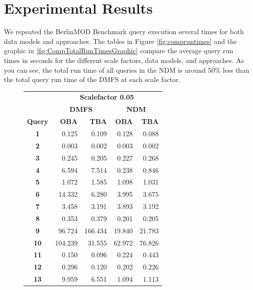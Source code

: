 \documentclass[a4paper]{article}
\newcommand{\bmodb} {BerlinMOD Benchmark}
\begin{document}
\section{Experimental Results}
\label{sec:results}
We repeated the \bmodb{} query execution several times for both data models and
approaches. The tables in Figure \ref{fig:compruntimes} and the graphic in
\ref{fig:CompTotalRunTimesGraphic} compare the average query run times in seconds
for the different scale factors, data models, and approaches.
As you can see, the total run time of all queries in the NDM is around
50\% less than the total query run time of the DMFS at each scale factor.
\begin{figure}[h]
  \begin{minipage}{0.5\linewidth}
    \begin{tiny}
      \begin{tabular}{|c|r|r|r|r|}
        \hline
        &\multicolumn{4}{c|}{\textbf{Scalefactor 0.05}}\\
        \cline{2-5}
        &\multicolumn{2}{c|}{\textbf{DMFS}}&\multicolumn{2}{c|}{\textbf{NDM}}\\
        \hline
        \textbf{Query}&\textbf{OBA}&\textbf{TBA}&\textbf{OBA}&\textbf{TBA}\\
        \hline
        \textbf{1}&0.125&0.109&0.128&0.088\\
        \hline
        \textbf{2}&0.003&0.002&0.003&0.002\\
        \hline
        \textbf{3}&0.245&0.205&0.227&0.268\\
        \hline
        \textbf{4}&6.594&7.514&0.238&0.846\\
        \hline
        \textbf{5}&1.072&1.585&1.098&1.031\\
        \hline
        \textbf{6}&14.332&6.280&3.995&3.675\\
        \hline
        \textbf{7}&3.458&3.191&3.893&3.192\\
        \hline
        \textbf{8}&0.353&0.379&0.201&0.205\\
        \hline
        \textbf{9}&96.724&166.434&19.840&21.783\\
        \hline
        \textbf{10}&104.239&31.555&62.972&76.826\\
        \hline
        \textbf{11}&0.150&0.096&0.224&0.443\\
        \hline
        \textbf{12}&0.296&0.120&0.202&0.226\\
        \hline
        \textbf{13}&9.959&6.551&1.094&1.113\\

\end{tabular}
\end{tiny}
\end{minipage}
\end{figure}
\end{document}

